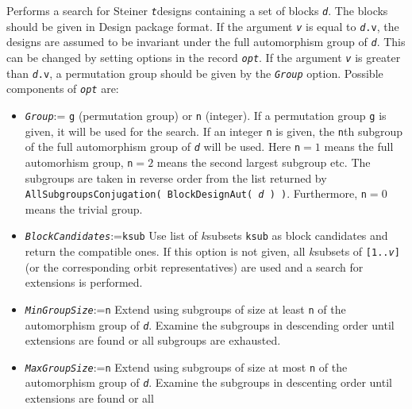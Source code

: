 \documentclass[a4paper,11pt]{report}
\begin{document}
{{{ Performs a search for Steiner \mbox{\texttt{\mdseries\slshape t}}\texttt{}designs containing a set of blocks \mbox{\texttt{\mdseries\slshape d}}. The blocks should be given in \textsf{Design} package format. If the argument \mbox{\texttt{\mdseries\slshape v}} is equal to \mbox{\texttt{\mdseries\slshape d}}\texttt{.v}, the designs are assumed to be invariant under the full automorphism group of \mbox{\texttt{\mdseries\slshape d}}. This can be changed by setting options in the record \mbox{\texttt{\mdseries\slshape opt}}. If the argument \mbox{\texttt{\mdseries\slshape v}} is greater than \mbox{\texttt{\mdseries\slshape d}}\texttt{.v}, a permutation group should be given by the \mbox{\texttt{\mdseries\slshape Group}} option. Possible components of \mbox{\texttt{\mdseries\slshape opt}} are: 
\begin{itemize}
\item \mbox{\texttt{\mdseries\slshape Group}}:= \texttt{g} (permutation group) or \texttt{n} (integer). If a permutation group \texttt{g} is given, it will be used for the search. If an integer \texttt{n} is given, the \texttt{n}\texttt{}th subgroup of the full automorphism group of \mbox{\texttt{\mdseries\slshape d}} will be used. Here \texttt{n}$=1$ means the full automorhism group, \texttt{n}$=2$ means the second largest subgroup etc. The subgroups are taken in reverse
order from the list returned by \texttt{AllSubgroupsConjugation( BlockDesignAut( }\mbox{\texttt{\mdseries\slshape d}}\texttt{ ) )}. Furthermore, \texttt{n}$=0$ means the trivial group. 
\item \mbox{\texttt{\mdseries\slshape BlockCandidates}}:=\texttt{ksub} Use list of $k$\texttt{}subsets \texttt{ksub} as block candidates and return the compatible ones. If this option is not
given, all $k$\texttt{}subsets of \texttt{[1..}\mbox{\texttt{\mdseries\slshape v}}\texttt{]} (or the corresponding orbit representatives) are used and a search for
extensions is performed.
\item \mbox{\texttt{\mdseries\slshape MinGroupSize}}:=\texttt{n} Extend using subgroups of size at least \texttt{n} of the automorphism group of \mbox{\texttt{\mdseries\slshape d}}. Examine the subgroups in descending order until extensions are found or all
subgroups are exhausted.
\item \mbox{\texttt{\mdseries\slshape MaxGroupSize}}:=\texttt{n} Extend using subgroups of size at most \texttt{n} of the automorphism group of \mbox{\texttt{\mdseries\slshape d}}. Examine the subgroups in descenting order until extensions are found or all

\end{itemize}}}}
\end{document}
